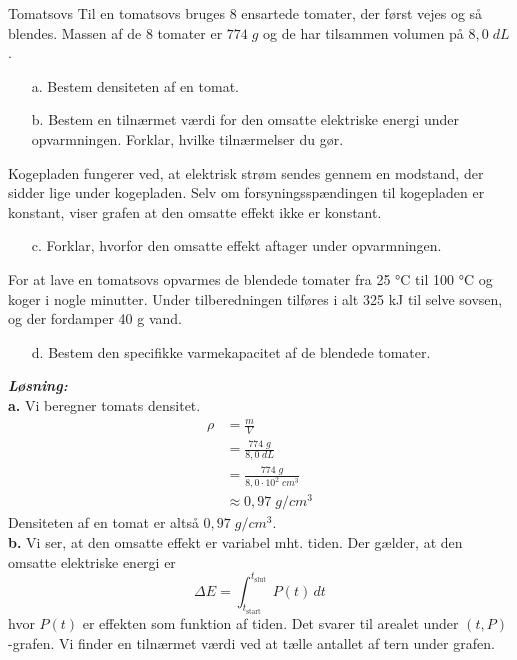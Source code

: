 \documentclass{report}
\newcommand{\sol}{\setlength{\parindent}{0cm}\textbf{\textit{Løsning:}}\setlength{\parindent}{1cm}}
\begin{document}
\begin{question}{Tomatsovs}{}
Til en tomatsovs bruges 8 ensartede tomater, der først vejes og så blendes.
Massen af de 8 tomater er $774 \;\unit{g} $ og de har tilsammen volumen på $8,0 \;\unit{dL} $. 
\begin{itemize}
  \item[a.] Bestem densiteten af en tomat.
  \item[b.] Bestem en tilnærmet værdi for den omsatte elektriske energi under opvarmningen. Forklar, hvilke tilnærmelser du gør.
\end{itemize}
Kogepladen fungerer ved, at elektrisk strøm sendes gennem en modstand, der sidder lige under kogepladen.
Selv om forsyningsspændingen til kogepladen er konstant, viser grafen at den omsatte effekt ikke er konstant.
\begin{itemize}
  \item[c.] Forklar, hvorfor den omsatte effekt aftager under opvarmningen.
\end{itemize}
For at lave en tomatsovs opvarmes de blendede tomater fra 25 °C til 100 °C og koger i nogle minutter.
Under tilberedningen tilføres i alt 325 kJ til selve sovsen, og der fordamper 40 g vand.
\begin{itemize}
  \item[d.] Bestem den specifikke varmekapacitet af de blendede tomater.
\end{itemize}
\end{question}
\sol \\
\textbf{a.}
Vi beregner tomats densitet.
\begin{equation*}
\begin{split}
\rho &=\frac{m}{V}\\
&=\frac{774 \;\unit{g} }{8,0 \;\unit{dL} }\\
&=\frac{774 \;\unit{g} }{8,0 \cdot 10^2 \;\unit{cm^3} }\\
&\approx 0,97 \;\unit{g/cm^3} 
\end{split}
\end{equation*}
Densiteten af en tomat er altså $0,97 \;\unit{g/cm^3} $.\\[1ex]
\textbf{b.}
Vi ser, at den omsatte effekt er variabel mht. tiden.
Der gælder, at den omsatte elektriske energi er 
\[
\Delta E = \int_{t_{\text{start} }}^{t_{\text{slut} }} P(t) \,dt 
\] 
hvor $P(t)$ er effekten som funktion af tiden. 
Det svarer til arealet under $(t,P)$-grafen.
Vi finder en tilnærmet værdi ved at tælle antallet af tern under grafen.
\end{document}
